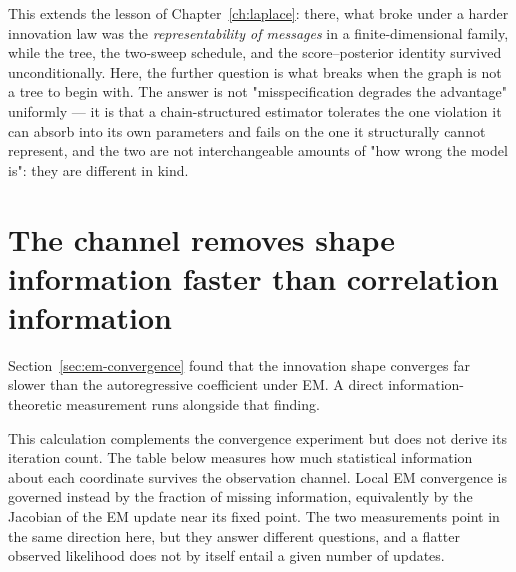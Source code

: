 \begin{remark}
This extends the lesson of Chapter~\ref{ch:laplace}: there, what broke
under a harder innovation law was the \emph{representability of messages} in
a finite-dimensional family, while the tree, the two-sweep schedule, and the
score--posterior identity survived unconditionally. Here, the further
question is what breaks when the graph is not a tree to begin with. The
answer is not "misspecification degrades the advantage" uniformly --- it is
that a chain-structured estimator tolerates the one violation it can
absorb into its own parameters and fails on the one it structurally cannot
represent, and the two are not interchangeable amounts of "how wrong the
model is": they are different in kind.
\end{remark}

\section{The channel removes shape information faster than correlation information}
\label{sec:em-information}

Section~\ref{sec:em-convergence} found that the innovation shape converges
far slower than the autoregressive coefficient under EM. A direct
information-theoretic measurement runs alongside that finding.

This calculation complements the convergence experiment but does not derive its
iteration count. The table below measures how much statistical information
about each coordinate survives the observation channel. Local EM convergence is
governed instead by the fraction of missing information, equivalently by the
Jacobian of the EM update near its fixed point. The two measurements point in
the same direction here, but they answer different questions, and a flatter
observed likelihood does not by itself entail a given number of updates.

